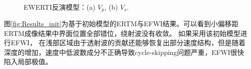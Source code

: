 \begin{figure}[!htb]
   \centering
   \\
   \caption{EWERTI反演模型：(a) $V_p$, (b) $V_s$.}
   \label{fig:InvertedModel_WERTI}
\end{figure}
图\ref{fig:Results_init}为基于初始模型的ERTM与EFWI结果。可以看到小偏移距ERTM成像结果中界面位置全部错位，绕射波没有收敛。
如果采用该初始模型进行EFWI，
在浅部区域由于透射波的贡献还能够恢复出部分速度结构，但是随着深度的增加，速度中低波数成分不正确导致cycle-skipping问题严重，EFWI很快
陷入局部极值。

